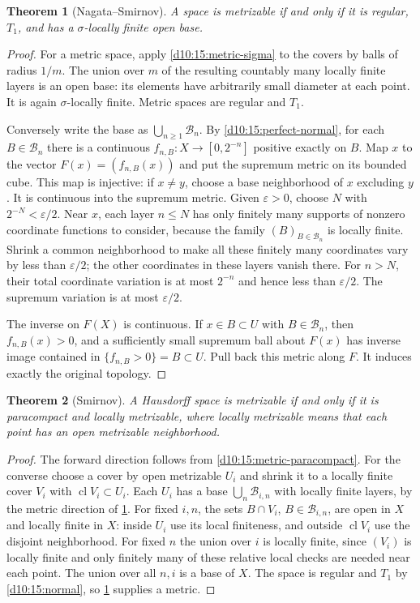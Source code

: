 \documentclass[11pt,oneside,openany]{book}
\newtheorem{theorem}{Theorem}[chapter]
\theoremstyle{definition}
\theoremstyle{remark}
\newcommand{\eps}{\varepsilon}
\DeclareMathOperator{\cl}{cl}
\begin{document}
\begin{theorem}[Nagata--Smirnov]\label{d10:15:nagata-smirnov}
A space is metrizable if and only if it is regular, $T_1$, and has a
$\sigma$-locally finite open base.
\end{theorem}
\begin{proof}
For a metric space, apply \cref{d10:15:metric-sigma} to the covers by
balls of radius $1/m$. The union over $m$ of the resulting countably
many locally finite layers is an open base: its elements have arbitrarily
small diameter at each point. It is again $\sigma$-locally finite.
Metric spaces are regular and $T_1$.

Conversely write the base as $\bigcup_{n\geq1}\mathcal B_n$.
By \cref{d10:15:perfect-normal}, for each $B\in\mathcal B_n$ there is
a continuous $f_{n,B}:X\to[0,2^{-n}]$ positive exactly on $B$.
Map $x$ to the vector $F(x)=(f_{n,B}(x))$ and put the supremum metric
on its bounded cube. This map is injective: if $x\ne y$, choose
a base neighborhood of $x$ excluding $y$.
It is continuous into the supremum metric. Given $\eps>0$, choose
$N$ with $2^{-N}<\eps/2$. Near $x$, each layer $n\leq N$ has only
finitely many supports of nonzero coordinate functions to consider,
because the family $(B)_{B\in\mathcal B_n}$ is locally finite.
Shrink a common neighborhood to make all these finitely many coordinates
vary by less than $\eps/2$; the other coordinates in these layers vanish
there. For $n>N$, their total coordinate variation is at most $2^{-n}$
and hence less than $\eps/2$. The supremum variation is at most $\eps/2$.

The inverse on $F(X)$ is continuous. If $x\in B\subset U$ with
$B\in\mathcal B_n$, then $f_{n,B}(x)>0$, and a sufficiently small
supremum ball about $F(x)$ has inverse image contained in
$\{f_{n,B}>0\}=B\subset U$. Pull back this metric along $F$.
It induces exactly the original topology.
\end{proof}

\begin{theorem}[Smirnov]\label{d10:15:smirnov}
A Hausdorff space is metrizable if and only if it is paracompact and locally
metrizable, where locally metrizable means that each point has an open
metrizable neighborhood.
\end{theorem}
\begin{proof}
The forward direction follows from \cref{d10:15:metric-paracompact}.
For the converse choose a cover by open metrizable $U_i$ and shrink it
to a locally finite cover $V_i$ with $\cl V_i\subset U_i$.
Each $U_i$ has a base $\bigcup_n\mathcal B_{i,n}$ with locally finite
layers, by the metric direction of \cref{d10:15:nagata-smirnov}.
For fixed $i,n$, the sets $B\cap V_i$, $B\in\mathcal B_{i,n}$,
are open in $X$ and locally finite in $X$: inside $U_i$ use its local
finiteness, and outside $\cl V_i$ use the disjoint neighborhood.
For fixed $n$ the union over $i$ is locally finite, since $(V_i)$ is
locally finite and only finitely many of these relative local checks are
needed near each point. The union over all $n,i$ is a base of $X$.
The space is regular and $T_1$ by \cref{d10:15:normal}, so
\cref{d10:15:nagata-smirnov} supplies a metric.
\end{proof}
\end{document}
